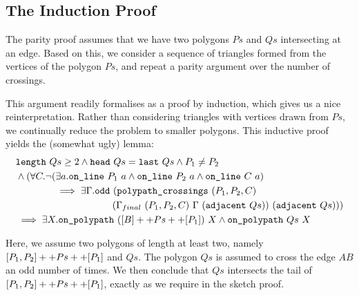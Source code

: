 \subsection{The Induction Proof}\label{sec:InductionProof}
The parity proof assumes that we have two polygons $Ps$ and $Qs$ intersecting at an edge. Based on this, we consider a sequence of triangles formed from the vertices of the polygon $Ps$, and repeat a parity argument over the number of crossings.

This argument readily formalises as a proof by induction, which gives us a nice reinterpretation. Rather than considering triangles with vertices drawn from $Ps$, we continually reduce the problem to smaller polygons. This inductive proof yields the (somewhat ugly) lemma:
\begin{equation}\label{eq:oddCrossClosedPolypath}
  \begin{aligned}
    &\texttt{length}\ Qs \geq 2 \wedge \texttt{head}\ Qs = \texttt{last}\ Qs\wedge P_1\neq P_2\\
    &\wedge (\forall C. \neg(\exists a.\texttt{on\_line}\ P_1\ a\wedge \texttt{on\_line}\ P_2\ a\wedge \texttt{on\_line}\ C\ a)\\
    &\qquad\qquad \implies \exists \Gamma. \texttt{odd}\ (\texttt{polypath\_crossings}\ (P_1,P_2,C)\\
    &\qquad\qquad\qquad\qquad\qquad(\Gamma_{final}\ (P_1,P_2,C)\ \Gamma\ (\texttt{adjacent}\ Qs))\ (\texttt{adjacent}\ Qs)))\\
    &\implies\exists X. \texttt{on\_polypath}\ ([B] ++ Ps ++ [P_1])\ X \wedge \texttt{on\_polypath}\ Qs\ X
  \end{aligned}
\end{equation}

Here, we assume two polygons of length at least two, namely $[P_1,P_2] ++ Ps ++ [P_1]$ and $Qs$. The polygon $Qs$ is assumed to cross the edge $AB$ an odd number of times. We then conclude that $Qs$ intersects the tail of $[P_1,P_2] ++ Ps ++ [P_1]$, exactly as we require in the sketch proof.

